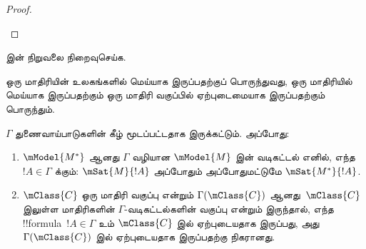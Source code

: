 \documentclass[../../../include/open-logic-section]{subfiles}
\begin{document}
\begin{proof}
\begin{enumerate}
  \end{enumerate}
\end{proof}

\begin{prob}
   இன் நிறுவலை நிறைவுசெய்க.
\end{prob}

ஒரு மாதிரியின் உலகங்களில் மெய்யாக இருப்பதற்குப் பொருந்துவது, ஒரு மாதிரியில்
மெய்யாக இருப்பதற்கும் ஒரு மாதிரி வகுப்பில் ஏற்புடைமையாக இருப்பதற்கும்
பொருந்தும்.

\begin{cor}
  $\Gamma$ துணைவாய்பாடுகளின் கீழ் மூடப்பட்டதாக இருக்கட்டும். அப்போது:
  \begin{enumerate}
  \item $\mModel{M^*}$ ஆனது $\Gamma$ வழியான $\mModel{M}$ இன் வடிகட்டல்
    எனில், எந்த $!A \in \Gamma$ க்கும்: $\mSat{M}{!A}$ அப்போதும்
    அப்போதுமட்டுமே $\mSat{M^*}{!A}$.
  \item $\mClass{C}$ ஒரு மாதிரி வகுப்பு என்றும் $\Gamma(\mClass{C})$
    ஆனது~$\mClass{C}$ இலுள்ள மாதிரிகளின் $\Gamma$-வடிகட்டல்களின் வகுப்பு
    என்றும் இருந்தால், எந்த !!{formula}~$!A \in \Gamma$ உம்
    $\mClass{C}$ இல் ஏற்புடையதாக இருப்பது, அது $\Gamma(\mClass{C})$ இல்
    ஏற்புடையதாக இருப்பதற்கு நிகரானது.
  \end{enumerate}
\end{cor}
\end{document}
